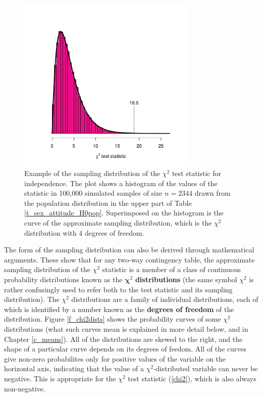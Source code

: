 \begin{figure}[t]
\caption{Example of the sampling distribution of the $\chi^{2}$ test
statistic for independence. The
plot shows a histogram of the values of the statistic in 100,000
simulated samples
of size $n=2344$ drawn from the population distribution in the upper
part of Table \ref{t_sex_attitude_H0pop}.
Superimposed on the histogram
is the curve of the approximate sampling
distribution, which is  the $\chi^{2}$ distribution with 4 degrees of
freedom.
}
\label{f_chisampld}
\begin{center}
\includegraphics[width=8.5cm]{chi2sims}
\end{center}
\vspace*{-3ex}
\end{figure}

The form of the sampling distribution can also be derived
through mathematical arguments. These show that
for any two-way contingency table, the approximate sampling distribution
of the $\chi^{2}$ statistic is a member of a class of continuous
probability distributions known as the $\boldsymbol{\chi}^{2}$
\textbf{distributions} (the same symbol $\chi^{2}$ is rather
confusingly used to refer both to the test statistic and its sampling
distribution). The $\chi^{2}$ distributions are a family of individual
distributions, each of which is identified by a number known as the
\textbf{degrees of freedom} of the distribution.
Figure \ref{f_chi2dists} shows the probability curves of some $\chi^{2}$
distributions (what such curves mean is explained in more detail below,
and in Chapter \ref{c_means}). All of the distributions are skewed to the right, and the
shape of a particular curve depends on its degrees of feedom. All of the
curves give non-zero probabilites only for positive values of the
variable on the horizontal axis, indicating that the value of a
$\chi^{2}$-distributed variable can never be negative. This is
appropriate for the $\chi^{2}$ test statistic (\ref{chi2}), which is
also always non-negative.

